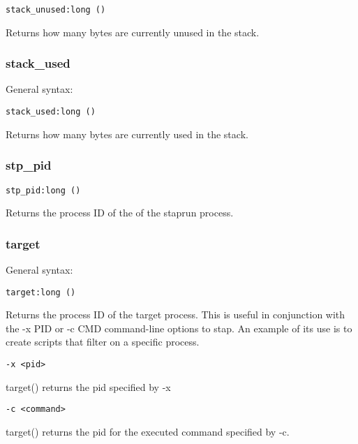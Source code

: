 \documentclass[twoside,english]{article}
\newenvironment{vindent}
{\begin{list}{}{\setlength{\listparindent}{6pt}}
\item[]}
{\end{list}}
\begin{document}
\begin{vindent}
\begin{verbatim}
stack_unused:long ()
\end{verbatim}
\end{vindent}
Returns how many bytes are currently unused in the stack.


\subsubsection{stack\_used}
General syntax:

\begin{vindent}
\begin{verbatim}
stack_used:long ()
\end{verbatim}
\end{vindent}
Returns how many bytes are currently used in the stack.


\subsubsection{stp\_pid}
\begin{vindent}
\begin{verbatim}
stp_pid:long ()
\end{verbatim}
\end{vindent}
Returns the process ID of the of the staprun process.


\subsubsection{target}
General syntax:

\begin{vindent}
\begin{verbatim}
target:long ()
\end{verbatim}
\end{vindent}
Returns the process ID of the target process. This is useful
in conjunction with the -x PID or -c CMD command-line options to stap. An
example of its use is to create scripts that filter on a specific process.

\begin{verbatim}
-x <pid>
\end{verbatim}
target() returns the pid specified by -x

\begin{verbatim}
-c <command>
\end{verbatim}
target() returns the pid for the executed command specified
by -c.
\end{document}
